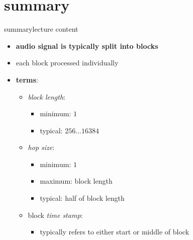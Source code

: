    \section{summary}
        \begin{frame}{summary}{lecture content}
            \begin{itemize}
                \item   \textbf{audio signal is typically split into blocks}
                \item   each block processed individually
                \smallskip
                \item   \textbf{terms}:
                    \begin{itemize}
                        \item   \textit{block length}:
                            \begin{itemize}
                                \item minimum: $1$
                                \item   typical: $256 \ldots 16384$
                            \end{itemize}
                        \item   \textit{hop size}:
                            \begin{itemize}
                                \item minimum: $1$
                                \item   maximum: block length
                                \item   typical: half of block length
                            \end{itemize}
                        \item   block \textit{time stamp}:
                            \begin{itemize}
                                \item typically refers to either start or middle of block
                            \end{itemize}
                    \end{itemize}
            \end{itemize}
        \end{frame}

